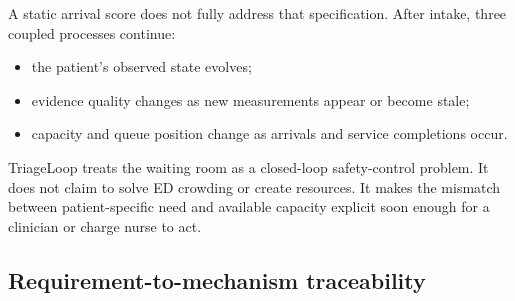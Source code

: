\documentclass[11pt,a4paper]{article}
\begin{document}
A static arrival score does not fully address that specification. After intake, three coupled processes continue:

\begin{itemize}
  \item the patient's observed state evolves;
  \item evidence quality changes as new measurements appear or become stale;
  \item capacity and queue position change as arrivals and service completions occur.
\end{itemize}

TriageLoop treats the waiting room as a closed-loop safety-control problem. It does not claim to solve ED crowding or create resources. It makes the mismatch between patient-specific need and available capacity explicit soon enough for a clinician or charge nurse to act.

\subsection{Requirement-to-mechanism traceability}
\end{document}
